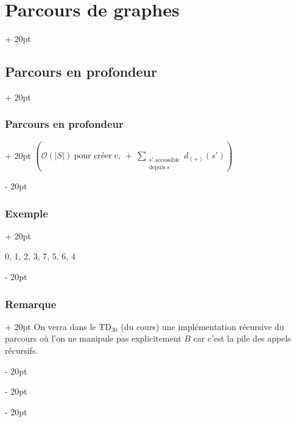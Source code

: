 \documentclass[a4paper, 12pt, twoside]{article}
\newcommand{\lr}[1]{\left( #1 \right)}
\newcommand{\abs}[1]{\left\lvert #1 \right\rvert}
\newcommand{\ind}[1][20pt]{\advance\leftskip + #1}
\newcommand{\deind}[1][20pt]{\advance\leftskip - #1}
\newenvironment{indt}[2][20pt]{#2 \par \ind[#1]}{\par \deind} %
\begin{document}
\begin{indt}{\section{Parcours de graphes}}
\begin{indt}{\subsection{Parcours en profondeur}}
\begin{indt}{\subsubsection{Parcours en profondeur}}
                $\lr{\mathcal O(\abs S)\ \text{pour créer}\ v,\ +\ \displaystyle \sum_{\substack{s'\ \text{accessible} \\ \text{depuis}\ s}} d_{(+)}(s')}$
            \end{indt}

            \vspace{12pt}
            
            \begin{indt}{\subsubsection{Exemple}}
                \begin{center}
                \end{center}

                0, 1, 2, 3, 7, 5, 6, 4
            \end{indt}

            \vspace{12pt}
            
            \begin{indt}{\subsubsection{Remarque}}
                On verra dans le TD$_{30}$ (du cours) une implémentation récursive du parcours où l'on ne manipule pas explicitement $B$ car c'est la pile des appels récursifs.
            \end{indt}


\end{indt}
\end{indt}
\end{document}
